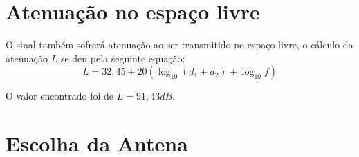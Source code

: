 \section{Atenuação no espaço livre}
O sinal também sofrerá atenuação ao ser transmitido no espaço livre, o cálculo da atenuação $L$ se deu pela seguinte equação:
\begin{equation}
L = 32,45 +20(\log_{10}(d_1+d_2) + \log_{10}f)
\end{equation}

O valor encontrado foi de $L = 91,43dB$.

\section{Escolha da Antena}
